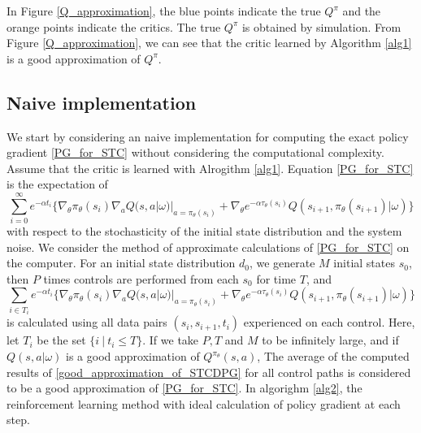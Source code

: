 \documentclass[english, dvipdfmx]{ampmt}             %
\begin{document}
In Figure \ref{Q_approximation}, the blue points indicate the true $Q^{\pi}$ and the orange points indicate the critics. The true $Q^{\pi}$ is obtained by simulation. From Figure \ref{Q_approximation}, we can see that the critic learned by Algorithm \ref{alg1} is a good approximation of $Q^{\pi}$.

\subsection{Naive implementation}
We start by considering an naive implementation for computing the exact policy gradient \eqref{PG_for_STC} without considering the computational complexity. Assume that the critic is learned with Alrogithm \ref{alg1}. Equation \eqref{PG_for_STC} is the expectation of
\begin{equation}
	\sum_{i=0}^{\infty} e^{-\alpha t_i}\{\nabla_{\theta}\pi_{\theta}(s_i)\nabla_{a}Q(s,a|\omega)|_{a=\pi_{\theta}(s_i)} + \nabla_{\theta}e^{-\alpha\tau_{\theta}(s_{i})}Q(s_{i+1},\pi_{\theta}(s_{i+1})|\omega)\} \label{path_gradient}
\end{equation}
with respect to the stochasticity of the initial state distribution and the system noise. We consider the method of approximate calculations of \eqref{PG_for_STC} on the computer. For an initial state distribution $d_0$, we generate $M$ initial states $s_0$, then $P$ times controls are performed from each $s_0$ for time $T$, and
\begin{equation}
	\sum_{i\in T_i} e^{-\alpha t_i}\{\nabla_{\theta}\pi_{\theta}(s_i)\nabla_{a}Q(s,a|\omega)|_{a=\pi_{\theta}(s_i)} + \nabla_{\theta}e^{-\alpha\tau_{\theta}(s_{i})}Q(s_{i+1},\pi_{\theta}(s_{i+1})|\omega)\} \label{good_approximation_of_STCDPG}
\end{equation}
is calculated using all data pairs $(s_i,s_{i+1}, t_i)$ experienced on each control. Here, let $T_i$ be the set $\{i~|~t_i \leq T\}$. If we take $P, T$ and $M$ to be infinitely large, and if $Q(s,a|\omega)$ is a good approximation of $Q^{\pi_{\theta}}(s,a)$, The average of the computed results of \eqref{good_approximation_of_STCDPG} for all control paths is considered to be a good approximation of \eqref{PG_for_STC}. In algorighm \ref{alg2}, the reinforcement learning method with ideal calculation of policy gradient at each step. 
\end{document}
